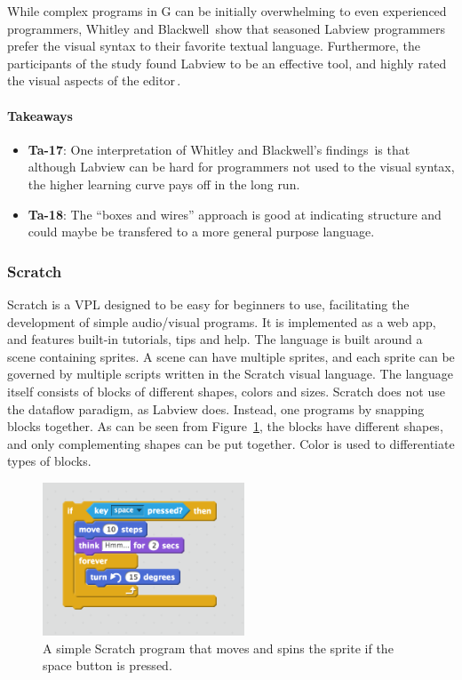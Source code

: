 While complex programs in G can be initially overwhelming to even experienced programmers, Whitley and Blackwell\,\cite[p. 445]{WHITLEY2001435} show that seasoned Labview programmers prefer the visual syntax to their favorite textual language. Furthermore, the participants of the study found Labview to be an effective tool, and highly rated the visual aspects of the
editor\,\cite[pp.
466]{WHITLEY2001435}.

\paragraph{Takeaways}
\begin{itemize}
	\item \textbf{Ta-17}: One interpretation of Whitley and Blackwell's findings\,\cite{WHITLEY2001435} is that although Labview can be hard for programmers not used to the visual syntax, the higher learning curve pays off in the long run.
	\item \textbf{Ta-18}: The ``boxes and wires'' approach is good at indicating structure and could maybe be transfered to a more general purpose language.
\end{itemize}


\subsubsection{Scratch}
\label{subsub:Scratch}
Scratch is a VPL designed to be easy for beginners to use, facilitating the development of simple audio/visual programs. It is implemented as a web app, and features built-in tutorials, tips and help.
The language is built around a scene containing sprites. A scene can have multiple sprites, and each sprite can be governed by multiple scripts written in the Scratch visual language. The language itself consists of blocks of different shapes, colors and sizes. Scratch does not use the dataflow paradigm, as Labview does. Instead, one programs by snapping blocks together. As can be seen from Figure~\ref{fig:ScratchProgram}, the blocks have different shapes, and only complementing shapes can be put together. Color is used to differentiate types of blocks.

\begin{figure}
	\centering
		\includegraphics[width=60mm]{diagrams/ScratchProgram.png}
	\caption{A simple Scratch program that moves and spins the sprite if the space button is pressed.}
\label{fig:ScratchProgram}
\end{figure}

